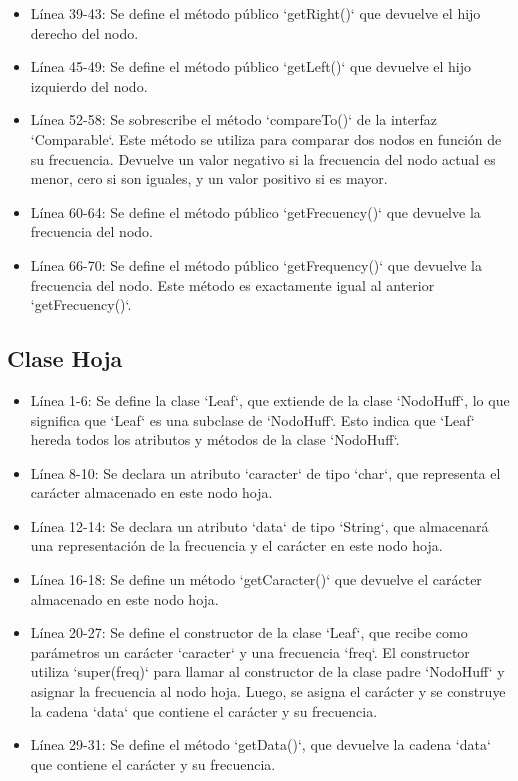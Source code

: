 \documentclass{article}
\begin{document}
\begin{itemize}
\item Línea 39-43: Se define el método público `getRight()` que devuelve el hijo derecho del nodo.

\item Línea 45-49: Se define el método público `getLeft()` que devuelve el hijo izquierdo del nodo.

\item Línea 52-58: Se sobrescribe el método `compareTo()` de la interfaz `Comparable`. Este método se utiliza para comparar dos nodos en función de su frecuencia. Devuelve un valor negativo si la frecuencia del nodo actual es menor, cero si son iguales, y un valor positivo si es mayor.

\item Línea 60-64: Se define el método público `getFrecuency()` que devuelve la frecuencia del nodo.

\item Línea 66-70: Se define el método público `getFrequency()` que devuelve la frecuencia del nodo. Este método es exactamente igual al anterior `getFrecuency()`.	\end{itemize}
	
	\subsection{Clase Hoja}
	
		
	\begin{itemize}	
		\item Línea 1-6: Se define la clase `Leaf`, que extiende de la clase `NodoHuff`, lo que significa que `Leaf` es una subclase de `NodoHuff`. Esto indica que `Leaf` hereda todos los atributos y métodos de la clase `NodoHuff`.

\item Línea 8-10: Se declara un atributo `caracter` de tipo `char`, que representa el carácter almacenado en este nodo hoja.

\item Línea 12-14: Se declara un atributo `data` de tipo `String`, que almacenará una representación de la frecuencia y el carácter en este nodo hoja.

\item Línea 16-18: Se define un método `getCaracter()` que devuelve el carácter almacenado en este nodo hoja.

\item Línea 20-27: Se define el constructor de la clase `Leaf`, que recibe como parámetros un carácter `caracter` y una frecuencia `freq`. El constructor utiliza `super(freq)` para llamar al constructor de la clase padre `NodoHuff` y asignar la frecuencia al nodo hoja. Luego, se asigna el carácter y se construye la cadena `data` que contiene el carácter y su frecuencia.

\item Línea 29-31: Se define el método `getData()`, que devuelve la cadena `data` que contiene el carácter y su frecuencia.


	\end{itemize}	
\end{document}
